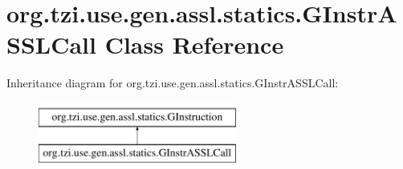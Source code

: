 \hypertarget{classorg_1_1tzi_1_1use_1_1gen_1_1assl_1_1statics_1_1_g_instr_a_s_s_l_call}{\section{org.\-tzi.\-use.\-gen.\-assl.\-statics.\-G\-Instr\-A\-S\-S\-L\-Call Class Reference}
\label{classorg_1_1tzi_1_1use_1_1gen_1_1assl_1_1statics_1_1_g_instr_a_s_s_l_call}
}
Inheritance diagram for org.\-tzi.\-use.\-gen.\-assl.\-statics.\-G\-Instr\-A\-S\-S\-L\-Call\-:\begin{figure}[H]
\begin{center}
\leavevmode
\includegraphics[height=2.000000cm]{classorg_1_1tzi_1_1use_1_1gen_1_1assl_1_1statics_1_1_g_instr_a_s_s_l_call}
\end{center}
\end{figure}

